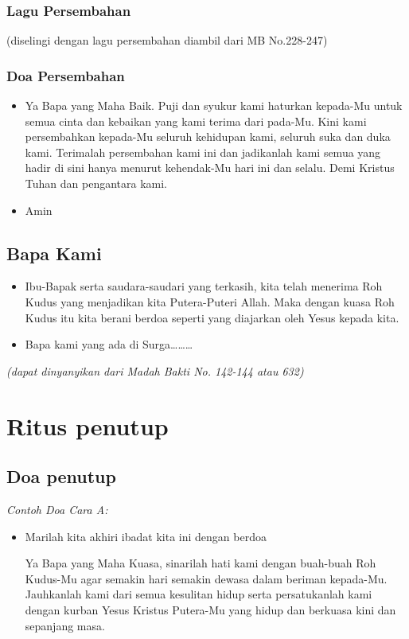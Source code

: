 \documentclass[a4paper,12pt]{article}
\newcommand{\BU}[1]{\begin{itemize} \item[U:] #1 \end{itemize}}
\newcommand{\BP}[1]{\begin{itemize} \item[P:] #1 \end{itemize}}
\newcommand{\BPU}[1]{\begin{itemize} \item[P+U:] #1 \end{itemize}}
\begin{document}
\subsubsection*{Lagu Persembahan}

(diselingi dengan lagu persembahan diambil dari MB No.228-247)

\subsubsection*{Doa Persembahan}

\BP{Ya Bapa yang Maha Baik. Puji dan syukur kami haturkan kepada-Mu untuk semua cinta dan kebaikan yang kami terima
dari pada-Mu. Kini kami persembahkan kepada-Mu seluruh kehidupan kami, seluruh suka dan duka kami. Terimalah
persembahan kami ini dan jadikanlah kami semua yang hadir di sini hanya menurut kehendak-Mu hari ini dan selalu. Demi
Kristus Tuhan dan pengantara kami.}

\BU{Amin}

\subsection*{Bapa Kami}

\BP{Ibu-Bapak serta saudara-saudari yang terkasih, kita telah menerima Roh Kudus yang menjadikan kita
Putera-Puteri Allah. Maka dengan kuasa Roh Kudus itu kita berani berdoa seperti yang diajarkan oleh Yesus kepada kita.}

\BPU{Bapa kami yang ada di Surga{\dots}{\dots}{\dots}}

\textit{(dapat dinyanyikan dari Madah Bakti No. 142-144 atau 632)}

\section{Ritus penutup}

\subsection*{Doa penutup}

\textit{Contoh Doa Cara A:}

\BP{Marilah kita akhiri ibadat kita ini dengan berdoa

 Ya Bapa yang Maha Kuasa, sinarilah hati kami dengan buah-buah Roh Kudus-Mu agar semakin hari semakin
dewasa dalam beriman kepada-Mu. Jauhkanlah kami dari semua kesulitan hidup serta persatukanlah
kami dengan kurban Yesus Kristus Putera-Mu yang hidup dan berkuasa kini dan sepanjang masa.}
\end{document}
